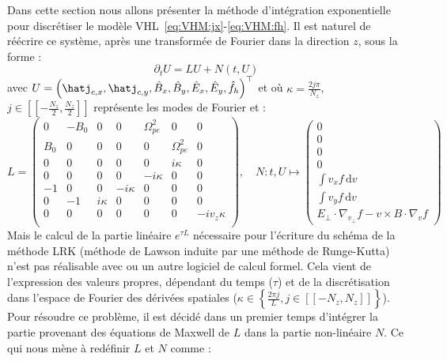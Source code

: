 Dans cette section nous allons présenter la méthode d'intégration exponentielle pour discrétiser le modèle VHL~\eqref{eq:VHM:jx}-\eqref{eq:VHM:fh}. Il est naturel de réécrire ce système, après une transformée de Fourier dans la direction $z$, sous la forme :
$$
  \partial_t U = LU + N(t,U)
$$
avec $U=\left( \hatj_{c,x},\hatj_{c,y},\hat{B}_x,\hat{B}_y,\hat{E}_x,\hat{E}_y,\hat{f}_h\right)^\top$ et où $\kappa=\frac{2j\pi}{N_z}$, $j\in[\![-\frac{N_z}{2},\frac{N_z}{2}]\!]$ représente les modes de Fourier et :
\begin{equation}
  L = \begin{pmatrix}
    0   & -B_0 & 0          &  0          &  \Omega_{pe}^2 & 0             & 0 \\
    B_0 &  0   & 0          &  0          &  0             & \Omega_{pe}^2 & 0 \\
    0   &  0   & 0          &  0          &  0             & i\kappa       & 0 \\
    0   &  0   & 0          &  0          & -i\kappa       & 0             & 0 \\
   -1   &  0   & 0          & -i\kappa    &  0             & 0             & 0 \\
    0   & -1   & i\kappa    &  0          &  0             & 0             & 0 \\
    0   &  0   & 0          &  0          &  0             & 0             & -iv_z\kappa \\
  \end{pmatrix},
  \quad
  N:t,U\mapsto \begin{pmatrix}
    0 \\
    0 \\
    0 \\
    0 \\
    \int v_x f \,\mathrm{d}v \\
    \int v_y f \,\mathrm{d}v \\
    E_{\perp}\cdot\nabla_{v_\perp} f - v\times B\cdot\nabla_v f
  \end{pmatrix}
  \label{eq:3:LNmaxwell}
\end{equation}
Mais le calcul de la partie linéaire $e^{\tau L}$ nécessaire pour l'écriture du schéma de la méthode LRK (méthode de Lawson induite par une méthode de Runge-Kutta) n'est pas réalisable avec \sympy{} ou un autre logiciel de calcul formel. Cela vient de l'expression des valeurs propres, dépendant du temps ($\tau$) et de la discrétisation dans l'espace de Fourier des dérivées spatiales ($\kappa\in\left\{\frac{2\pi j}{L},j\in[\![-N_z,N_z]\!]\right\}$). Pour résoudre ce problème, il est décidé dans un premier temps d'intégrer la partie provenant des équations de Maxwell de $L$ dans la partie non-linéaire $N$. Ce qui nous mène à redéfinir $L$ et $N$ comme :
